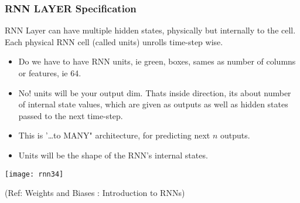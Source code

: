 \begin{frame}[fragile] \frametitle{RNN LAYER Specification}
RNN Layer can have multiple hidden states, physically but internally to the cell. Each physical RNN cell (called units) unrolls time-step wise.

\begin{itemize}
\item Do we have to have RNN units, ie green, boxes, sames as number of columns or features, ie 64. %
\item No! units will be your output dim. Thats inside direction, its about number of internal state values, which are given as outputs as well as hidden states passed to the next time-step.
\item This is '\ldots to MANY" architecture, for predicting next $n$ outputs.
\item Units will be the shape of the RNN's internal states. 
\end{itemize}

\begin{center}
\texttt{[image: rnn34]}

{\tiny (Ref: Weights and Biases : Introduction to RNNs)}

\end{center}


\end{frame}

